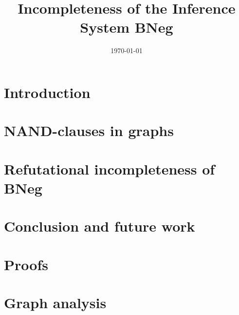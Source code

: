 \documentclass[11pt, a4paper]{report}   	%
\title{Incompleteness of the Inference System BNeg}
\author{\name}
\date{\today}
\theoremstyle{plain}
\theoremstyle{definition}
\begin{document}
	\maketitle
	\tableofcontents
  \chapter{Introduction}
  \label{chap:Introduction}
  
  
  
  
	
	
	
	
	\chapter{NAND-clauses in graphs}
	\label{chap:NAND-clauses in graphs}
	
	
	
	
  
	
  
	\chapter{Refutational incompleteness of BNeg}
	\label{chap:Refutational incompleteness of BNeg}
	
	
	
  
  \pagebreak %
  
  
  \chapter{Conclusion and future work}
  \label{chap:Conclusion and future work}
  
  \appendix
  \chapter{Proofs}
  \label{chap:Proofs}
  
	\pagebreak
	
	\pagebreak
	
  \pagebreak
  \chapter{Graph analysis}
  \label{chap:Graph analysis}
  
  \pagebreak
	\printbibliography
\end{document}
